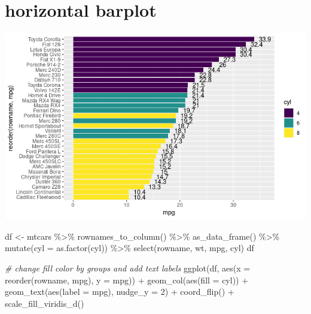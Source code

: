 \documentclass[
]{book}
\newenvironment{Shaded}{\begin{snugshade}}{\end{snugshade}}
\newcommand{\AttributeTok}[1]{\textcolor[rgb]{0.77,0.63,0.00}{#1}}
\newcommand{\CommentTok}[1]{\textcolor[rgb]{0.56,0.35,0.01}{\textit{#1}}}
\newcommand{\DecValTok}[1]{\textcolor[rgb]{0.00,0.00,0.81}{#1}}
\newcommand{\FunctionTok}[1]{\textcolor[rgb]{0.00,0.00,0.00}{#1}}
\newcommand{\NormalTok}[1]{#1}
\newcommand{\OtherTok}[1]{\textcolor[rgb]{0.56,0.35,0.01}{#1}}
\newcommand{\SpecialCharTok}[1]{\textcolor[rgb]{0.00,0.00,0.00}{#1}}
\begin{document}
\hypertarget{horizontal-barplot}{%
\section{horizontal barplot}\label{horizontal-barplot}}

\includegraphics{images/10/00000b.png}

\begin{Shaded}
\begin{Highlighting}[]

\NormalTok{df }\OtherTok{\textless{}{-}}\NormalTok{ mtcars }\SpecialCharTok{\%\textgreater{}\%}
  \FunctionTok{rownames\_to\_column}\NormalTok{() }\SpecialCharTok{\%\textgreater{}\%}
  \FunctionTok{as\_data\_frame}\NormalTok{() }\SpecialCharTok{\%\textgreater{}\%}
  \FunctionTok{mutate}\NormalTok{(}\AttributeTok{cyl =} \FunctionTok{as.factor}\NormalTok{(cyl)) }\SpecialCharTok{\%\textgreater{}\%}
  \FunctionTok{select}\NormalTok{(rowname, wt, mpg, cyl)}
\NormalTok{df}

\CommentTok{\# change fill color by groups and add text labels}
\FunctionTok{ggplot}\NormalTok{(df, }\FunctionTok{aes}\NormalTok{(}\AttributeTok{x =} \FunctionTok{reorder}\NormalTok{(rowname, mpg), }\AttributeTok{y =}\NormalTok{ mpg)) }\SpecialCharTok{+}
  \FunctionTok{geom\_col}\NormalTok{(}\FunctionTok{aes}\NormalTok{(}\AttributeTok{fill =}\NormalTok{ cyl)) }\SpecialCharTok{+} 
  \FunctionTok{geom\_text}\NormalTok{(}\FunctionTok{aes}\NormalTok{(}\AttributeTok{label =}\NormalTok{ mpg), }\AttributeTok{nudge\_y =} \DecValTok{2}\NormalTok{) }\SpecialCharTok{+} 
  \FunctionTok{coord\_flip}\NormalTok{() }\SpecialCharTok{+}
  \FunctionTok{scale\_fill\_viridis\_d}\NormalTok{()}
\end{Highlighting}
\end{Shaded}
\end{document}
